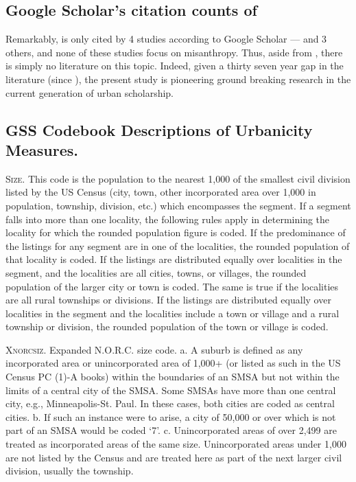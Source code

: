 \documentclass[11pt, letterpaper]{article}
\begin{document}
\begin{spacing}{1.4}
\subsection{Google Scholar's citation counts of  \citet{wilson85}}

Remarkably, \citet{wilson85} is only cited by 4 studies according to Google Scholar
---\citet{smith97} and 3 others, and none of these studies focus on
misanthropy. Thus, aside from \citet{wilson85}, there is simply no literature on
this topic. %
 Indeed, given a
thirty seven year gap in the literature (since \citet{wilson85}), the present study is pioneering ground breaking research in the current generation of urban scholarship.


\subsection{GSS Codebook Descriptions of Urbanicity Measures.}   

\textsc{Size}. This code is the population to the nearest 1,000 of the smallest civil
division listed by the US Census (city, town, other incorporated
area over 1,000 in population, township, division, etc.) which
encompasses the segment. If a segment falls into more than one
locality, the following rules apply in determining the locality for
which the rounded population figure is coded.
If the predominance of the listings for any segment are in one of the
localities, the rounded population of that locality is coded.
If the listings are distributed equally over localities in the
segment, and the localities are all cities, towns, or villages, the
rounded population of the larger city or town is coded. The same is
true if the localities are all rural townships or divisions.
If the listings are distributed equally over localities in the segment
and the localities include a town or village and a rural township or
division, the rounded population of the town or village is coded.

\textsc{Xnorcsiz}. Expanded N.O.R.C. size code. 
a. A suburb is defined as any incorporated area or unincorporated area
of 1,000+ (or listed as such in the US Census PC (1)-A books) within
the boundaries of an SMSA but not within the limits of a central city
of the SMSA. Some SMSAs have more than one central city, e.g.,
Minneapolis-St. Paul. In these cases, both cities are coded as central
cities.
b. If such an instance were to arise, a city of 50,000 or over which is
not part of an SMSA would be coded `7'.
c. Unincorporated areas of over 2,499 are treated as incorporated areas
of the same size. Unincorporated areas under 1,000 are not listed by
the Census and are treated here as part of the next larger civil
division, usually the township.


\end{spacing}
\end{document}
